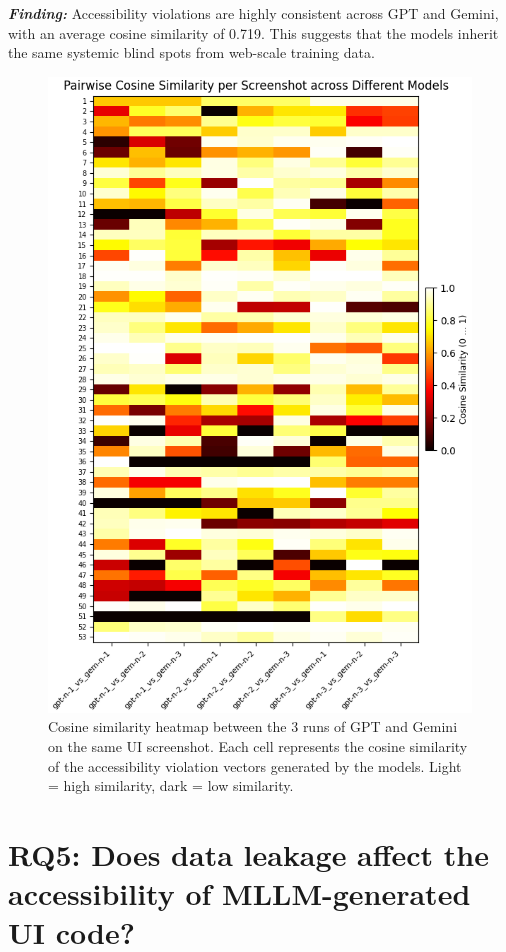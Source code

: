 \begin{center}
\begin{tcolorbox}[colback=black!5!white,colframe=black!75!black,bottom=-0.05pt,top=-0.05pt]
\textit{\textbf{Finding:}} Accessibility violations 
are highly consistent across GPT and Gemini, with an 
average cosine similarity of 0.719. This suggests that 
the models inherit the same systemic blind spots from 
web-scale training data.
\end{tcolorbox}
\end{center}


\begin{figure}
  \centering
  \includegraphics[width=0.4\linewidth]{figures/cosinesim.png}
  \caption{Cosine similarity heatmap between the 3 runs of GPT and Gemini on the same UI screenshot. 
  Each cell represents the cosine similarity of the accessibility violation vectors generated by the models.
  Light = high similarity, dark = low similarity.}
  \label{fig:cosinesimilarity} 
\end{figure}





\section{RQ5: Does data leakage affect the accessibility of MLLM-generated UI code?}
